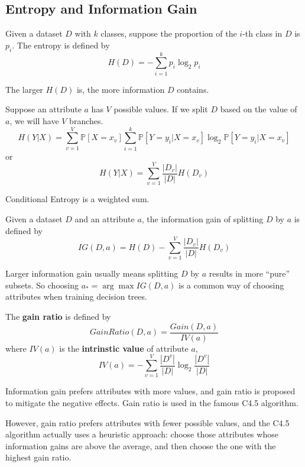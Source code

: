     \subsection{Entropy and Information Gain}
    \begin{definition}[Entropy]
        Given a dataset $D$ with $k$ classes, suppose the proportion of the $i$-th class in $D$ is $p_i$. The entropy is defined by
        \[ H(D) = -\sum_{i=1}^k p_i \log_2 p_i \]
    \end{definition}
    \begin{remark}
            The larger $H(D)$ is, the more information $D$ contains.
    \end{remark}

    \begin{definition}
        Suppose an attribute $a$ has $V$ possible values. If we split $D$ based on the value of $a$, we will have $V$ branches.
        \[ H(Y|X) = \sum_{v=1}^V \mathbb{P}[X=x_v]\sum_{i=1}^k\mathbb{P}[Y=y_i|X=x_v]\log_2\mathbb{P}[Y=y_i|X=x_v] \]
        or
        \[ H(Y|X) = \sum_{v=1}^V\frac{|D_v|}{|D|}H(D_v) \]
    \end{definition}
    \begin{remark}
        Conditional Entropy is a weighted sum.
    \end{remark}

    \begin{definition}
        Given a dataset $D$ and an attribute $a$, the information gain of splitting $D$ by $a$ is defined by
        \[ IG(D,a) = H(D) - \sum_{v=1}^V\frac{|D_v|}{|D|}H(D_v) \]
    \end{definition}
    \begin{remark}
        Larger information gain usually means splitting $D$ by $a$ results in more ``pure'' subsets. So choosing $a_* = \arg\max IG(D,a)$ is a common way of choosing attributes when training decision trees.
    \end{remark}

    \begin{definition}
        The \textbf{gain ratio} is defined by
        \[ GainRatio(D,a) = \frac{Gain(D,a)}{IV(a)} \]
        where $IV(a)$ is the \textbf{intrinstic value} of attribute $a$,
        \[ IV(a) = -\sum_{v=1}^V \frac{|D^v|}{|D|}\log_2\frac{|D^v|}{|D|} \]
    \end{definition}
    \begin{remark}
        Information gain prefers attributes with more values, and gain ratio is proposed to mitigate the negative effects. Gain ratio is used in the famous C4.5 algorithm.

        However, gain ratio prefers attributes with fewer possible values, and the C4.5 algorithm actually uses a heuristic approach: choose those attributes whose information gains are above the average, and then choose the one with the highest gain ratio.
    \end{remark}

